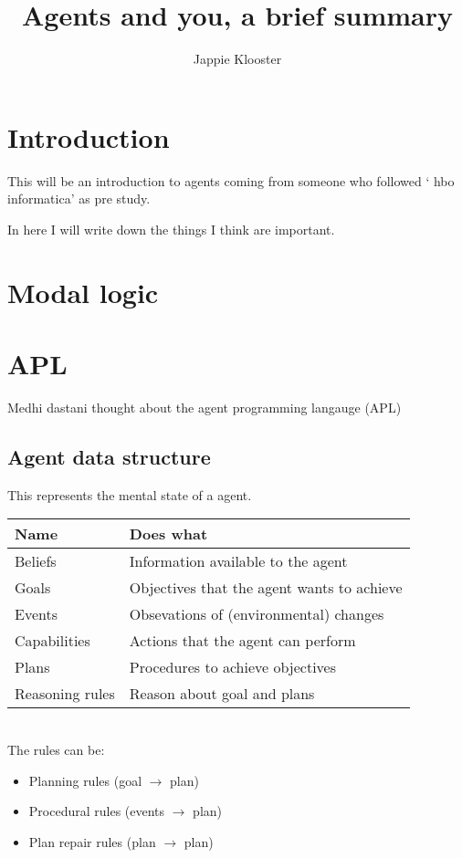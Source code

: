\documentclass{article}
\begin{document}
\lstset{language=Java}
\author{Jappie Klooster}
\title{Agents and you, a brief summary}
\maketitle

\section{Introduction}
This will be an introduction to agents coming from someone who followed
` hbo informatica' as pre study.

In here I will write down the things I think are important.

\section{Modal logic}

\section{APL}
Medhi dastani thought about the agent programming langauge (APL)

\subsection{Agent data structure}
This represents the mental state of a agent. \\
\begin{tabular}{ll}
	Name & Does what \\ \toprule
	Beliefs & Information available to the agent \\
	Goals & Objectives that the agent wants to achieve \\
	Events & Obsevations of (environmental) changes \\
	Capabilities & Actions that the agent can perform \\
	Plans & Procedures to achieve objectives \\
	Reasoning rules & Reason about goal and plans \\
\end{tabular} \\

\noindent
The rules can be:

\begin{itemize}
	\item Planning rules (goal $\to$ plan)
	\item Procedural rules (events $\to$ plan)
	\item Plan repair rules (plan $\to$ plan)
\end{itemize}
\end{document}
